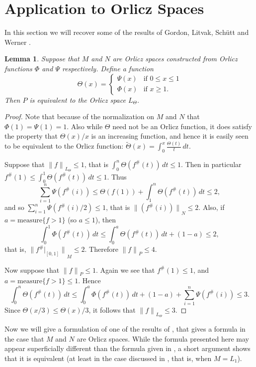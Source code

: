 \documentclass[12pt]{amsart}
\newtheorem{lemma}[thm]{Lemma}
\newcommand{\snormo}[1]{{\mathopen\|#1\mathclose\|}}
\newcommand{\measure}{\text{measure}}
\begin{document}
\section{Application to Orlicz Spaces}

In this section we will recover some of the results of
Gordon, Litvak, Sch\"utt and Werner \cite{gordon et al}.

\begin{lemma}
\label{l equiv}
Suppose that $M$ and $N$ are Orlicz spaces constructed
from Orlicz functions $\Phi$ and $\Psi$ respectively.  
Define a function
\[
   \Theta(x) = \left\{
   \begin{array}{cl}
     \Psi(x) & \text{if }0\le x \le 1\\
     \Phi(x) & \text{if }x \ge 1.
   \end{array} \right.
\]
Then $P$ is equivalent to the Orlicz space $L_\Theta$.
\end{lemma}

\begin{proof}
Note that because of the normalization on $M$ and $N$ that 
$\Phi(1) = \Psi(1) = 1$.  Also while
$\Theta$ need not be an Orlicz function, 
it does satisfy the property that $\Theta(x)/x$ is an increasing 
function, and hence it is easily seen to
be equivalent
to the Orlicz function:
$\tilde\Theta(x) = \int_0^x \frac{\Theta(t)} t \, dt $.

Suppose that $\snormo f_{L_\Theta} \le 1$, that is
$\int_0^n \Theta(f^\#(t)) \, dt \le 1 $.
Then in particular $f^\#(1) \le \int_0^1 \Theta(f^\#(t)) \, dt \le 1 $.
Thus
\[
   \sum_{i=1}^n \Psi(f^\#(i)) \le \Theta(f(1)) + 
     \int_1^n \Theta(f^\#(t)) \, dt \le 2 ,
\]
and so $\sum_{i=1}^n \Psi(f^\#(i)/2) \le 1$, that is 
$\snormo{(f^\#(i))}_N \le 2$.
Also, if $a = \measure\{f>1\}$ (so $a\le 1$), then
\[
   \int_0^1 \Phi(f^\#(t)) \, dt \le
   \int_0^a \Theta(f^\#(t)) \, dt + (1-a) \le 2,
\]
that is, $\snormo{f^\#|_{[0,1]}}_M \le 2$.  Therefore $\snormo f_P \le 4$.

Now suppose that $\snormo f_P \le 1$.  Again we see that $f^\#(1) \le 1$,
and $a = \measure\{f>1\} \le 1$.  Hence
\[
   \int_0^n \Theta(f^\#(t)) \, dt \le
   \int_0^a \Phi(f^\#(t)) \, dt + (1-a) + 
   \sum_{i=1}^n \Psi(f^\#(i)) \le 3 .
\]
Since $\Theta(x/3) \le \Theta(x)/3$, it follows that
$\snormo f_{L_\Theta} \le 3$.
\end{proof}

Now we will give a formulation of one of the results of
\cite{gordon et al}, that gives a formula in the case that $M$ and
$N$ are Orlicz spaces.  While the formula presented here may appear
superficially different than the formula given in \cite{gordon et al},
a short argument shows that it is equivalent (at least in
the case discussed in \cite{gordon et al}, that is, when $M = L_1$).
\end{document}
